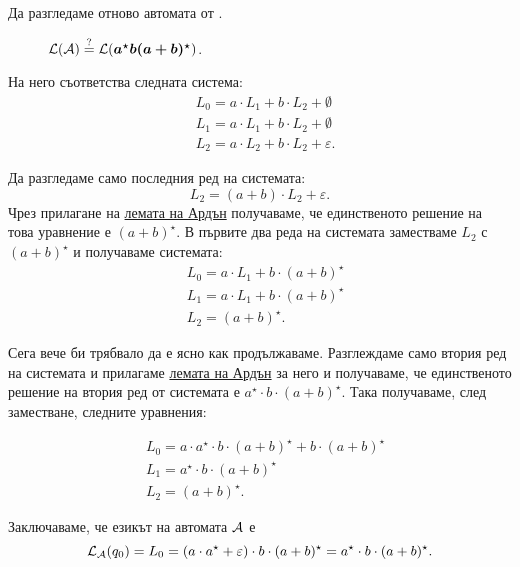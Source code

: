 \begin{example}
Да разгледаме отново автомата от .

\begin{figure}[H]
  \begin{center}
  \end{center}
  \caption{$\mathcal{L}(\mathcal{A}) \stackrel{?}{=} \mathcal{L}(\bm{a^\star b(a+b)^\star})$.}
\end{figure}

На него съответства следната система:
\begin{align*}
  & L_0 = a \cdot L_1 + b \cdot L_2 + \emptyset\\
  & L_1 = a \cdot L_1 + b \cdot L_2 + \emptyset\\
  & L_2 = a \cdot L_2 + b \cdot L_2 + \varepsilon.
\end{align*}


Да разгледаме само последния ред на системата:
\[L_2 = (a+b) \cdot L_2 + \varepsilon.\]
Чрез прилагане на \hyperref[lem:regular:system:arden]{лемата на Ардън} получаваме, че
единственото решение на това уравнение е $(a+b)^\star$.
В първите два реда на системата заместваме $L_2$ с $(a+b)^\star$ и получаваме системата:
\begin{align*}
  & L_0 = a \cdot L_1 + b \cdot (a+b)^\star\\
  & L_1 = a \cdot L_1 + b \cdot (a+b)^\star\\
  & L_2 = (a+b)^\star.
\end{align*}

Сега вече би трябвало да е ясно как продължаваме. Разглеждаме само втория ред на системата и 
прилагаме \hyperref[lem:regular:system:arden]{лемата на Ардън} за него и получаваме, че единственото
решение на втория ред от системата е $a^\star \cdot b \cdot (a+b)^\star$.
Така получаваме, след заместване, следните уравнения:

\begin{align*}
  & L_0 = a \cdot a^\star \cdot b \cdot (a+b)^\star + b \cdot (a+b)^\star\\
  & L_1 = a^\star \cdot b \cdot (a+b)^\star\\
  & L_2 = (a+b)^\star.
\end{align*}

Заключаваме, че езикът на автомата $\mathcal{A}$ е
\[\mathcal{L}_{\mathcal{A}}(q_0) = L_0 = (a \cdot a^\star + \varepsilon) \cdot b \cdot (a+b)^\star = a^\star \cdot b \cdot (a+b)^\star.\]
\end{example}


